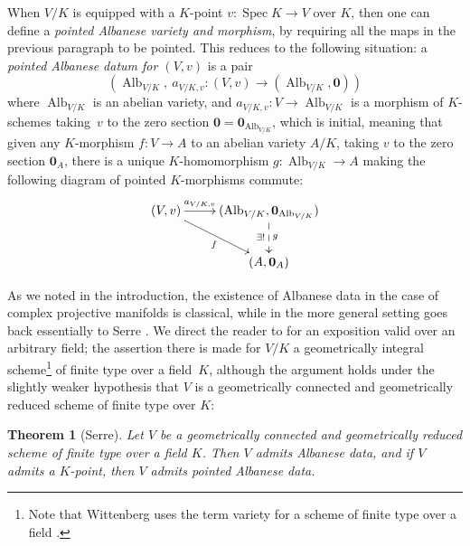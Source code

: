 \documentclass[11pt, reqno]{amsart}
\numberwithin{equation}{section}
\newtheorem{teo}{Theorem}[section]
\theoremstyle{definition}
\theoremstyle{remark}
\begin{document}
 When $V/K$ is equipped with a $K$-point $v:\operatorname{Spec}K\to V$ over $K$,
 then one can define a \emph{pointed Albanese variety and morphism}, by requiring all the maps in the
 previous paragraph to be pointed.  This reduces to the following situation: a
 \emph{pointed Albanese datum for $(V,v)$} is a pair 
  \begin{equation}\label{E:PAlbDat}
 (\operatorname{Alb}_{V/K},\ a_{V/K,v}:(V,v)\to (\operatorname{Alb}_{V/K},\mathbf 0 ))
  \end{equation}
  where $\operatorname{Alb}_{V/K}$ is an abelian
 variety, and $a_{V/K,v}:V\to \operatorname{Alb}_{V/K}$ is a morphism of $K$-schemes
 taking~$v$ to the zero section $\mathbf 0=\mathbf 0_{\operatorname{Alb}_{V/K}}$, which is initial,  meaning that given any
 $K$-morphism $f:V\to A$  to an abelian variety $A/K$, taking $v$ to the zero
 section $\mathbf 0_A$, there is a unique $K$-homomorphism $g:\operatorname{Alb}_{V/K}\to A$ making
 the following diagram of pointed $K$-morphisms commute:
 $$
 \xymatrix{
  (V,v) \ar[r]^<>(0.5){a_{V/K,v}} \ar[rd]_f& ( \operatorname{Alb}_{V/K},\mathbf 0_{\operatorname{Alb}_{V/K}}) \ar@{-->}[d]_{\exists !}^g \\
 & (A,\mathbf 0_A)
 }
 $$





As we noted in the introduction, the existence of Albanese data in the case of complex projective manifolds is classical, while in the more general setting goes back essentially to Serre \cite{serrealb}.  We
        direct the reader to \cite[Thm.~A.1 and p.836]{wittenberg08}
        for an exposition valid over an arbitrary field; the
        assertion there is made for $V/K$ a geometrically integral
        scheme\footnote{Note that Wittenberg uses the term variety for a scheme of finite type over a field \cite[p.807]{wittenberg08}.} of finite type over a field~$K$, although the
        argument holds under the slightly weaker hypothesis that $V$ is a geometrically connected  and 
        geometrically reduced 
        scheme of finite type over $K$:   
 \begin{teo}[Serre]\label{T:Serre-Alb}
  Let $V$ be a geometrically connected and  geometrically reduced scheme
  of finite type over a field $K$.  Then $V$ admits Albanese data, and if $V$ admits
  a $K$-point, then $V$ admits pointed Albanese data. 
  \end{teo}
\end{document}
